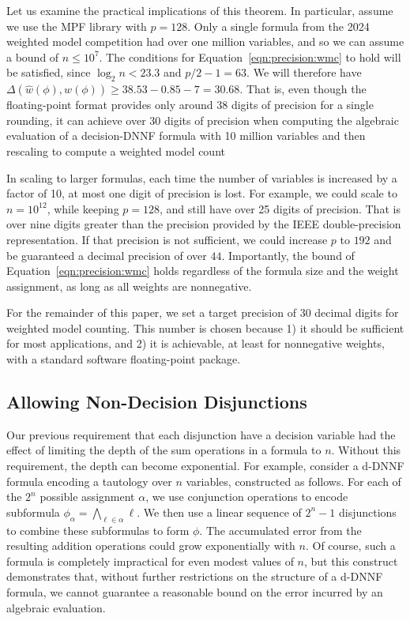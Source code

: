 \documentclass[letterpaper,USenglish,cleveref, autoref, thm-restate]{lipics-v2021}
\newcommand{\lit}{\ell}
\newcommand{\approximate}[1]{\hat{#1}}
\newcommand{\approxw}{\approximate{w}}
\newcommand{\digitprecision}{\Delta}
\newcommand{\assign}{\alpha}
\begin{document}
Let us examine the practical implications of this theorem.  In
particular, assume we use the MPF library with $p=128$.  Only a single
formula from the 2024 weighted model competition had over one million
variables, and so we can assume a bound of $n \leq 10^7$.  The
conditions for Equation~\ref{eqn:precision:wmc} to hold will 
be satisfied, since $\log_2 n < 23.3$ and $p/2-1 = 63$.  We will
therefore have $\digitprecision(\approxw(\phi), w(\phi)) \geq 38.53 -
0.85 - 7 = 30.68$.  That is, even though the floating-point format
provides only around 38 digits of precision for a single rounding,
it can achieve over 30 digits of precision when
computing the algebraic evaluation of a decision-DNNF formula with 10
million variables and then rescaling to compute a weighted model count

In scaling to larger formulas, each time
the number of variables is increased by a factor of 10, at most one
digit of precision is lost.  For example, we could scale to $n=10^{12}$, while keeping $p=128$, and still have over 25 digits of precision.  That is over nine digits greater than the precision
provided by the IEEE double-precision representation.  If that precision is not sufficient, we could increase $p$ to $192$ and be guaranteed a decimal precision of over $44$.
Importantly, the bound of Equation~\ref{eqn:precision:wmc} holds regardless of the formula size and the weight assignment, 
as long as all weights are nonnegative.

For the remainder of this paper, we set a target precision of 30 decimal digits for
weighted model counting.  This number is chosen because 1) it should be
sufficient for most applications, and 2) it
is achievable, at least for nonnegative weights, with a standard software floating-point package.

\subsection{Allowing Non-Decision Disjunctions}
\label{sect:ddnnf}

Our previous requirement that each disjunction have a decision
variable had the effect of limiting the depth of the sum operations in
a formula to $n$.  Without this requirement, the depth can become
exponential.  For example, consider a d-DNNF formula encoding a
tautology over $n$ variables, constructed as follows.  For each of the
$2^n$ possible assignment $\assign$, we use conjunction operations to
encode subformula $\phi_{\assign} = \bigwedge_{\lit \in \assign} \lit$.  We then
use a linear sequence of $2^n-1$ disjunctions to combine these subformulas to
form $\phi$.  The accumulated error from the resulting addition operations could grow
exponentially with $n$.  Of course, such a formula is completely
impractical for even modest values of $n$, but this construct
demonstrates that, without further restrictions on the structure of a
d-DNNF formula, we cannot guarantee a reasonable bound on the error incurred by an algebraic evaluation.
\end{document}
